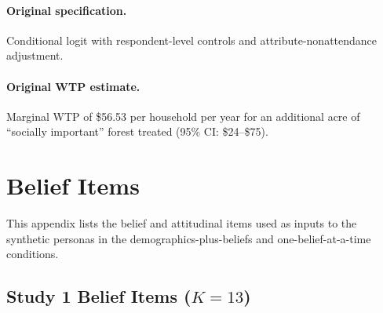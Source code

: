 \documentclass[12pt]{article}
\begin{document}
\paragraph{Original specification.} Conditional logit with respondent-level controls and attribute-nonattendance adjustment.

\paragraph{Original WTP estimate.} Marginal WTP of \$56.53 per household per year for an additional acre of ``socially important'' forest treated (95\% CI: \$24--\$75).

\section{Belief Items}\label{app:belief-items}

This appendix lists the belief and attitudinal items used as inputs to the synthetic personas in the demographics-plus-beliefs and one-belief-at-a-time conditions.

\subsection{Study 1 Belief Items ($K = 13$)}
\end{document}
